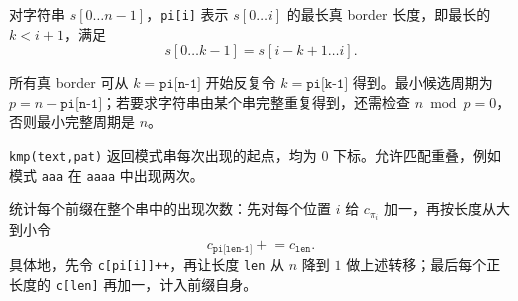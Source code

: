 对字符串 $s[0\ldots n-1]$，\texttt{pi[i]} 表示 $s[0\ldots i]$ 的最长真 border 长度，即最长的 $k<i+1$，满足
\[
  s[0\ldots k-1]=s[i-k+1\ldots i].
\]

所有真 border 可从 $k=\texttt{pi[n-1]}$ 开始反复令 $k=\texttt{pi[k-1]}$ 得到。最小候选周期为 $p=n-\texttt{pi[n-1]}$；若要求字符串由某个串完整重复得到，还需检查 $n\bmod p=0$，否则最小完整周期是 $n$。

\texttt{kmp(text,pat)} 返回模式串每次出现的起点，均为 $0$ 下标。允许匹配重叠，例如模式 \texttt{aaa} 在 \texttt{aaaa} 中出现两次。

统计每个前缀在整个串中的出现次数：先对每个位置 $i$ 给 $c_{\pi_i}$ 加一，再按长度从大到小令
\[
  c_{\texttt{pi[len-1]}}\mathrel{+}=c_{\texttt{len}}.
\]
具体地，先令 \texttt{c[pi[i]]++}，再让长度 \texttt{len} 从 $n$ 降到 $1$ 做上述转移；最后每个正长度的 \texttt{c[len]} 再加一，计入前缀自身。
